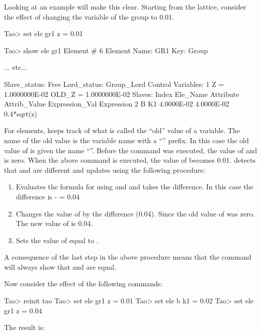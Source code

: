 \documentclass{hitec}     %
\begin{document}
Looking at an example will make this clear. Starting from the  lattice, consider the effect
of changing the  variable of the group  to 0.01.
\begin{code} 
Tao> set ele gr1 z = 0.01

Tao> show ele gr1
 Element #                6
 Element Name: GR1
 Key: Group

... etc...    

Slave_status: Free
Lord_status:  Group_Lord
Control Variables:
    1   Z  =  1.0000000E-02           OLD_Z  =  1.0000000E-02
Slaves:
   Index   Ele_Name  Attribute   Attrib_Value  Expression_Val    Expression
       2   B         K1            4.0000E-02      4.0000E-02    0.4*sqrt(z)
\end{code}
For  elements, \bmad keeps track of what is called the ``old'' value of a variable. The
name of the old value is the variable name with a ``'' prefix. In this case the old value
of  is given the name ``''. Before the  command was executed, the
value of  and  is zero. When the above  command is executed, the
value of  becomes 0.01. \bmad detects that  and  are different and updates
 using the following procedure: \vspace{-5 pt}
\begin{enumerate}
\item
Evaluates the formula for  using  and  and takes the difference.
In this case the difference is  -  = 0.04
\item
Changes the value of  by the difference (0.04).
Since the old value of  was zero. The new value of  is 0.04.
\item
Sets the value of  equal to .
\end{enumerate}
A consequence of the last step in the above procedure means that the  command will
always show that  and  are equal.

Now consider the effect of the following commands:
\begin{code}
Tao> reinit tao
Tao> set ele gr1 z = 0.01
Tao> set ele b k1 = 0.02
Tao> set ele gr1 z = 0.04
\end{code}

The result is:
\end{document}

